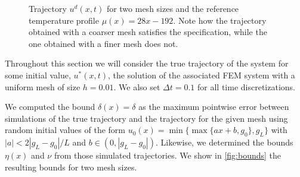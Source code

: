 \documentclass[oribibl]{llncs/llncs}
\begin{document}
\begin{figure}[!t]
    \centering 
        \hfill
        \hfill
    \caption{Trajectory $u^d(x, t)$ for two mesh sizes and the reference
        temperature profile $\mu(x) = 28x - 192$. Note how the trajectory
        obtained with a coarser mesh satisfies the specification, while the one
        obtained with a finer mesh does not.}
    \label{fig:ex1_evolution}
\end{figure}


Throughout this
section we will consider the true trajectory of the system for some initial
value, $u^*(x, t)$, the solution of the associated FEM system with a uniform mesh of
size $h = 0.01$. We also set $\Delta t = 0.1$ for all time discretizations.

We computed the bound $\delta(x) = \delta$ as the maximum pointwise
error between simulations of the true trajectory and the trajectory for the
given mesh using random initial values of the form $u_0(x) = \min\{\max\{a x +
b, g_0\}, g_L\}$ with $|a| < 2 |g_L - g_0| / L$ and $b \in (0, |g_L - g_0|)$.
Likewise, we determined the bounds $\eta(x)$ and $\nu$ from those simulated
trajectories. We show in \cref{fig:bounds} the resulting bounds for two mesh
sizes.
\end{document}
